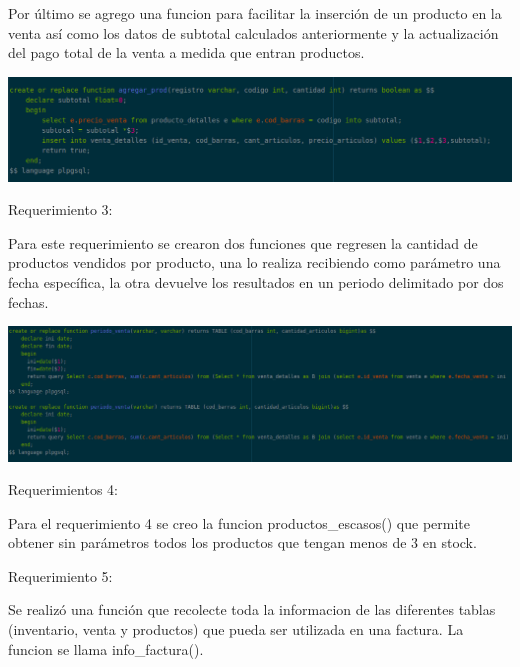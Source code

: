\documentclass[12pt, letterpaper]{article}     %
\begin{document}
Por último se agrego una funcion para facilitar la inserción de un producto en la venta así como los datos de subtotal calculados anteriormente y la actualización del pago total de la venta a medida que entran productos.	

	
	\begin{center}
   	\includegraphics[scale=0.40]{req24}
	\end{center}
	
	Requerimiento 3:
	
	Para este requerimiento se crearon dos funciones que regresen la cantidad de productos vendidos por producto, una lo realiza recibiendo como parámetro una fecha específica, la otra devuelve los resultados en un periodo delimitado por dos fechas.
	
	
	\begin{center}
   	\includegraphics[scale=0.35]{req3}
	\end{center}
	
	Requerimientos 4:
	
	Para el requerimiento 4 se creo la funcion productos\_escasos() que permite obtener sin parámetros todos los productos que tengan menos de 3 en stock.
	
			\vspace{5mm} %

	Requerimiento 5:
	
			\vspace{5mm} %

	Se realizó una función que recolecte toda la informacion de las diferentes tablas (inventario, venta y productos) que pueda ser utilizada en una factura. La funcion se llama info\_factura().
	
			\vspace{5mm} %
\end{document}
